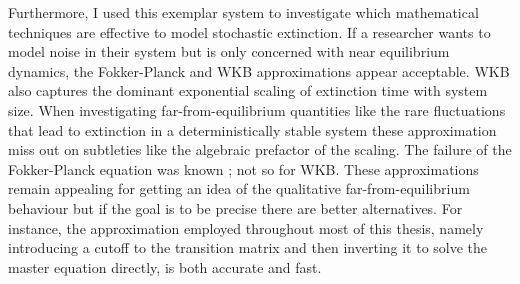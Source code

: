Furthermore, I used this exemplar system to investigate which mathematical techniques are effective to model stochastic extinction. 
If a researcher wants to model noise in their system but is only concerned with near equilibrium dynamics, the Fokker-Planck and WKB approximations appear acceptable. 
WKB also captures the dominant exponential scaling of extinction time with system size. 
When investigating far-from-equilibrium quantities like the rare fluctuations that lead to extinction in a deterministically stable system these approximation miss out on subtleties like the algebraic prefactor of the scaling. 
The failure of the Fokker-Planck equation was known \cite{Grasman1983,Doering2005}; not so for WKB. 
These approximations remain appealing for getting an idea of the qualitative far-from-equilibrium behaviour but if the goal is to be precise there are better alternatives. 
For instance, the approximation employed throughout most of this thesis, namely introducing a cutoff to the transition matrix and then inverting it to solve the master equation directly, is both accurate and fast. 

